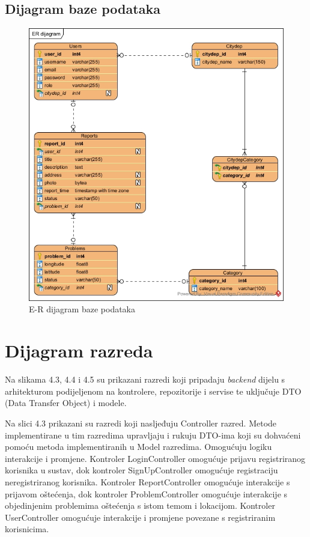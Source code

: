 \subsection{Dijagram baze podataka}

\begin{figure}[H]
	\includegraphics[scale=0.725]{slike/ERD-model} %
	\centering
	\caption{E-R dijagram baze podataka}
	\label{fig:ERdijagramBazePodataka}
\end{figure}

\eject


\section{Dijagram razreda}

Na slikama 4.3, 4.4 i 4.5 su prikazani razredi koji pripadaju \textit{backend} dijelu 
s arhitekturom podijeljenom na kontrolere, repozitorije i servise te uključuje DTO 
(Data Transfer Object) i modele. \newline

Na slici 4.3 prikazani su razredi koji nasljeđuju Controller razred. Metode implementirane u tim razredima 
upravljaju i rukuju DTO-ima koji su dohvaćeni pomoću metoda implementiranih u Model razredima. Omogućuju 
logiku interakcije i promjene. Kontroler LoginController omogućuje prijavu registriranog korisnika u sustav,
dok kontroler SignUpController omogućuje registraciju neregistriranog korisnika. Kontroler ReportController
omogućuje interakcije s prijavom oštećenja, dok kontroler ProblemController omogućuje interakcije s 
objedinjenim problemima oštećenja s istom temom i lokacijom. Kontroler UserController omogućuje interakcije i
promjene povezane s registriranim korisnicima.

